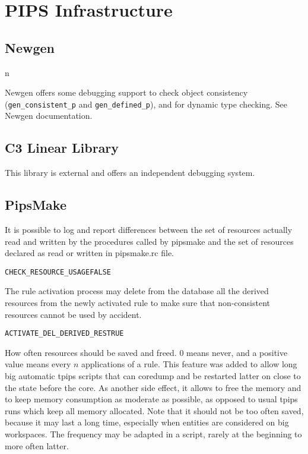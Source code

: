 \documentclass[a4paper]{report}
\newenvironment{PipsProp}{\begin{alltt}}{\end{alltt}}
\begin{document}
\section{PIPS Infrastructure}
\label{section-pips-infrastructure}

\subsection{Newgen}
n

Newgen offers some debugging support to check object consistency
(\verb+gen_consistent_p+ and \verb+gen_defined_p+), and for dynamic type
checking. See Newgen documentation\cite{JT89}\cite{JT90}.

\subsection{C3 Linear Library}

This library is external and offers an independent debugging system.

\subsection{PipsMake}

It is possible to log and report differences between the set of resources
actually read and written by the procedures called by pipsmake and the set
of resources declared as read or written in pipsmake.rc file.

\begin{PipsProp}
CHECK_RESOURCE_USAGE FALSE
\end{PipsProp}

The rule activation process may delete from the database all the
derived resources from the newly activated rule to make sure that
non-consistent resources cannot be used by accident.

\begin{PipsProp}
ACTIVATE_DEL_DERIVED_RES TRUE
\end{PipsProp}

How often resources should be saved and freed. $0$ means never, and
a positive value means every $n$ applications of a rule. This feature
was added to allow long big automatic tpips scripts that can coredump and
be restarted latter on close to the state before the core. As another side
effect, it allows to free the memory and to keep memory consumption as
moderate as possible, as opposed to usual tpips runs which keep all
memory allocated. Note that it should not be too often saved, because it
may last a long time, especially when entities are considered on big
workspaces. The frequency may be adapted in a script, rarely at the
beginning to more often latter.
\end{document}
